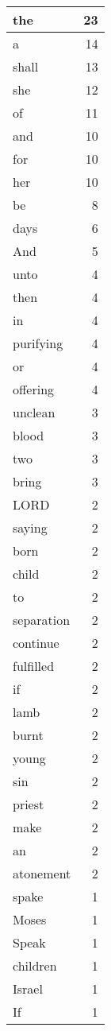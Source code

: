 \begin{center}
\begin{longtable}{l|r}
\hline \hline
\endlastfoot
the & 23 \\ \hline
a & 14 \\ \hline
shall & 13 \\ \hline
she & 12 \\ \hline
of & 11 \\ \hline
and & 10 \\ \hline
for & 10 \\ \hline
her & 10 \\ \hline
be & 8 \\ \hline
days & 6 \\ \hline
And & 5 \\ \hline
unto & 4 \\ \hline
then & 4 \\ \hline
in & 4 \\ \hline
purifying & 4 \\ \hline
or & 4 \\ \hline
offering & 4 \\ \hline
unclean & 3 \\ \hline
blood & 3 \\ \hline
two & 3 \\ \hline
bring & 3 \\ \hline
LORD & 2 \\ \hline
saying & 2 \\ \hline
born & 2 \\ \hline
child & 2 \\ \hline
to & 2 \\ \hline
separation & 2 \\ \hline
continue & 2 \\ \hline
fulfilled & 2 \\ \hline
if & 2 \\ \hline
lamb & 2 \\ \hline
burnt & 2 \\ \hline
young & 2 \\ \hline
sin & 2 \\ \hline
priest & 2 \\ \hline
make & 2 \\ \hline
an & 2 \\ \hline
atonement & 2 \\ \hline
spake & 1 \\ \hline
Moses & 1 \\ \hline
Speak & 1 \\ \hline
children & 1 \\ \hline
Israel & 1 \\ \hline
If & 1 \\ \hline

\end{longtable}
\end{center}
